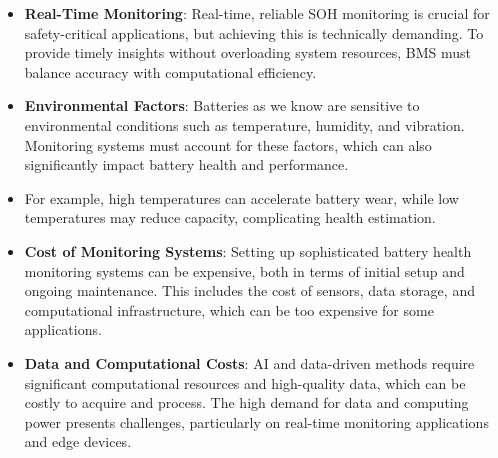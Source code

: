 \begin{itemize}
    \item \textbf{Real-Time Monitoring}: Real-time, reliable SOH monitoring is crucial for safety-critical applications, but achieving this is technically demanding. To provide timely insights without overloading system resources, BMS must balance accuracy with computational efficiency.
    \item \textbf{Environmental Factors}: Batteries as we know are sensitive to environmental conditions such as temperature, humidity, and vibration. Monitoring systems must account for these factors, which can also significantly impact battery health and performance.
    \item For example, high temperatures can accelerate battery wear, while low temperatures may reduce capacity, complicating health estimation.
    \item \textbf{Cost of Monitoring Systems}: Setting up sophisticated battery health monitoring systems can be expensive, both in terms of initial setup and ongoing maintenance. This includes the cost of sensors, data storage, and computational infrastructure, which can be too expensive for some applications.
    \item \textbf{Data and Computational Costs}: AI and data-driven methods require significant computational resources and high-quality data, which can be costly to acquire and process. The high demand for data and computing power presents challenges, particularly on real-time monitoring applications and edge devices.
\end{itemize}




